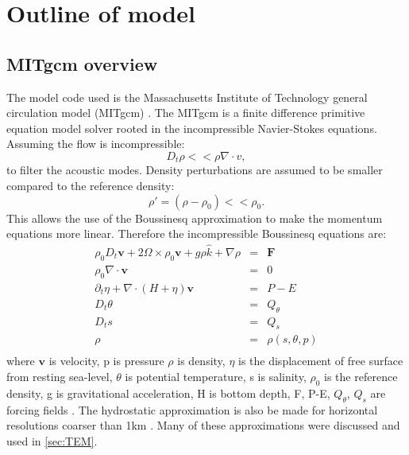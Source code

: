 \section{Outline of model}
\subsection{MITgcm overview}
The model code used is the Massachusetts Institute of Technology general circulation model (MITgcm) \citep{jmarshall1997}. The MITgcm is a finite difference primitive equation model solver rooted in the incompressible Navier-Stokes equations.
Assuming the flow is incompressible:
\begin{equation}
D_t \rho << \rho \nabla \cdot \textbf{$v$} ,
\label{eq:incompressible}
\end{equation}
to filter the acoustic modes.
Density perturbations are assumed to be smaller compared to the reference density:
\begin{equation}
\rho ' = (\rho - \rho _0) << \rho _0 .
\label{eq:smallrho}
\end{equation}
This allows the use of the Boussinesq approximation to make the momentum equations more linear. Therefore the incompressible Boussinesq equations are:
\begin{equation}
\begin{array}{rcl}
\rho _0 D_t \mathbf{v} + 2 \Omega \times \rho _0 \mathbf{v} + g \rho \hat{k} + \nabla \rho &=& \mathbf{F} \\
\rho _0 \nabla \cdot \mathbf{v} &=&  0 \\
\partial _t \eta + \nabla \cdot ( H + \eta)\mathbf{v} &=& P - E\\ 
D_t \theta &=& Q_\theta \\
D_t s &=& Q_s \\
\rho &=& \rho (s, \theta, p) \\
\end{array}
\label{eq:prim_eqs}
\end{equation}
where $\mathbf{v}$ is velocity, p is pressure $\rho$ is density, $\eta $ is the displacement of free surface from resting sea-level, $\theta$ is potential temperature, s is salinity, $\rho _0$ is the reference density, g is gravitational acceleration, H is bottom depth, F, P-E, $Q_\theta$, $Q_s$ are forcing fields \citep{Adcroft2004}. The hydrostatic approximation is also be made for horizontal resolutions coarser than 1km \citep{Adcroft2004}. Many of these approximations were discussed and used in \ref{sec:TEM}. 

